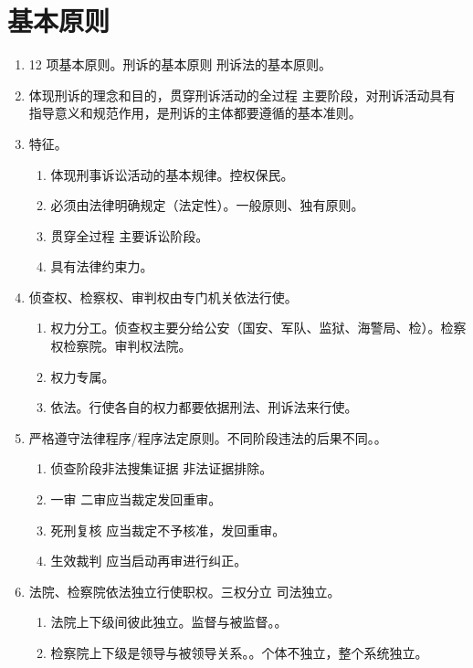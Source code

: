 \section{基本原则}
\begin{enumerate}
  \item 12 项基本原则。刑诉的基本原则 \bdy 刑诉法的基本原则。
  \item 体现刑诉的理念和目的，贯穿刑诉活动的全过程 \hz 主要阶段，对刑诉活动具有指导意义和规范作用，是刑诉的主体都要遵循的基本准则。
  \item 特征。
        \begin{enumerate}
          \item 体现刑事诉讼活动的基本规律。控权保民。
          \item 必须由法律明确规定（法定性）。一般原则、独有原则。
          \item 贯穿全过程 \hz 主要诉讼阶段。
          \item 具有法律约束力。
        \end{enumerate}
  \item 侦查权、检察权、审判权由专门机关依法行使。
        \begin{enumerate}
          \item 权力分工。侦查权主要分给公安（国安、军队、监狱、海警局、检）。检察权检察院。审判权法院。
          \item 权力专属。
          \item 依法。行使各自的权力都要依据刑法、刑诉法来行使。
        \end{enumerate}
  \item 严格遵守法律程序/程序法定原则。不同阶段违法的后果不同。。
        \begin{enumerate}
          \item 侦查阶段非法搜集证据 \yjt 非法证据排除。
          \item 一审 \yjt 二审应当裁定发回重审。
          \item 死刑复核 \yjt 应当裁定不予核准，发回重审。
          \item 生效裁判 \yjt 应当启动再审进行纠正。
        \end{enumerate}
  \item \san 法院、检察院依法独立行使职权。\bdy 三权分立 \bdy 司法独立。
        \begin{enumerate}
          \item 法院上下级间彼此独立。监督与被监督。。
          \item 检察院上下级是领导与被领导关系。。个体不独立，整个系统独立。

\end{enumerate}
\end{enumerate}
